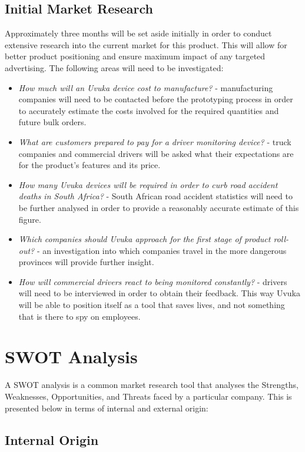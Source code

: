 \subsection{Initial Market Research}
Approximately three months will be set aside initially in order to conduct extensive research into the current market for this product. This will allow for better product positioning and ensure maximum impact of any targeted advertising. The following areas will need to be investigated:
\begin{itemize}
	\item \textit{How much will an Uvuka device cost to manufacture?} - manufacturing companies will need to be contacted before the prototyping process in order to accurately estimate the costs involved for the required quantities and future bulk orders.
	\item \textit{What are customers prepared to pay for a driver monitoring device?} - truck companies and commercial drivers will be asked what their expectations are for the product's features and its price.
	\item \textit{How many Uvuka devices will be required in order to curb road accident deaths in South Africa?} - South African road accident statistics will need to be further analysed in order to provide a reasonably accurate estimate of this figure.
	\item \textit{Which companies should Uvuka approach for the first stage of product roll-out?} - an investigation into which companies travel in the more dangerous provinces will provide further insight.
	\item \textit{How will commercial drivers react to being monitored constantly?} - drivers will need to be interviewed in order to obtain their feedback. This way Uvuka will be able to position itself as a tool that saves lives, and not something that is there to spy on employees.
\end{itemize}

 \section{SWOT Analysis}
A SWOT analysis is a common market research tool that analyses the Strengths, Weaknesses, Opportunities, and Threats faced by a particular company. This is presented below in terms of internal and external origin:
\pagebreak
\subsection{Internal Origin}
